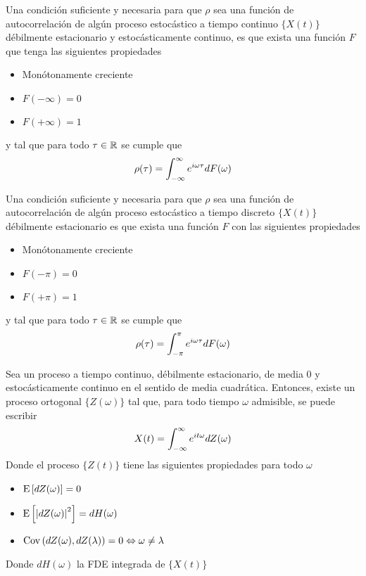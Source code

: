 \begin{teorema}
Una condición suficiente y necesaria para que $\rho$ sea una función de autocorrelación de 
algún proceso estocástico a tiempo continuo $\{X(t)\}$ débilmente estacionario y 
estocásticamente continuo, es que exista una función $F$ que tenga las siguientes propiedades
\begin{itemize}
\item Monótonamente creciente
\item $F(-\infty) = 0$
\item $F(+\infty) = 1$
\end{itemize}
y tal que para todo $\tau \in \mathbb{R}$ se cumple que
\begin{equation*}
\rho(\tau) = \int_{-\infty}^{\infty} e^{i \omega \tau} dF(\omega)
\end{equation*}
\label{t_wienerkhinchin}
\end{teorema}

\begin{teorema}[Wold]
Una condición suficiente y necesaria para que $\rho$ sea una función de autocorrelación de 
algún proceso estocástico a tiempo discreto $\{X(t)\}$ débilmente estacionario es que exista 
una función $F$ con las siguientes propiedades
\begin{itemize}
\item Monótonamente creciente
\item $F(-\pi) = 0$
\item $F(+\pi) = 1$
\end{itemize}
y tal que para todo $\tau \in \mathbb{R}$ se cumple que
\begin{equation*}
\rho(\tau) = \int_{-\pi}^{\pi} e^{i \omega \tau} dF(\omega)
\end{equation*}
\label{t_wold}
\end{teorema}

\begin{teorema}
Sea \xt un proceso a tiempo continuo, débilmente estacionario, de media 0 y estocásticamente 
continuo en el sentido de media cuadrática. Entonces, existe un proceso 
ortogonal $\{Z(\omega)\}$ tal que, para todo tiempo $\omega$ admisible, se puede 
escribir
\begin{equation*}
X(t) = \int_{-\infty}^{\infty} e^{i t \omega} dZ(\omega)
\end{equation*}
Donde el proceso $\{Z(t)\}$ tiene las siguientes propiedades para todo $\omega$
\begin{itemize}
\item $\mathrm{E}\left[ dZ(\omega) \right] = 0$
\item $\mathrm{E}\left[ \left| dZ(\omega) \right|^{2} \right] = dH(\omega)$
\item $\mathrm{Cov}\left( dZ(\omega),dZ(\lambda) \right) = 0 \Leftrightarrow \omega \neq \lambda$
\end{itemize}
Donde $dH(\omega)$ la FDE integrada de $\{X(t)\}$
\label{rep_espectral}
\end{teorema}

